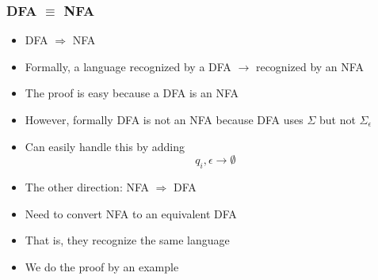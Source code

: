 




\begin{frame}[allowframebreaks] \frametitle{DFA $\equiv$ NFA}
  \begin{itemize}
\item DFA $\Rightarrow$ NFA

\item Formally, a language recognized by a DFA $\rightarrow$
  recognized by an NFA

\item The proof is easy because a DFA is an NFA
\item However, \alert{formally DFA is not an NFA}
because DFA uses $\Sigma$ but not $\Sigma_\epsilon$

\item [] Can easily handle this by adding
  \begin{equation*}
  q_i, \epsilon \rightarrow \emptyset
\end{equation*}
\item The other direction: NFA $\Rightarrow $ DFA

\item Need to convert NFA to an equivalent DFA
\item [] That is, they recognize the same language
\item We do the proof by an example
\end{itemize}\end{frame}

